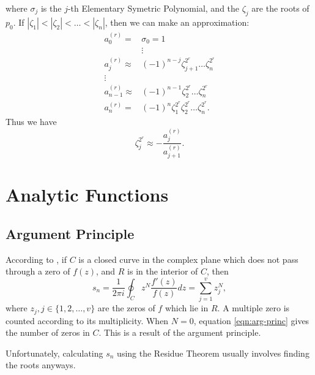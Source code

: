 \documentclass{article}
\begin{document}
where $\sigma_j$ is the $j$-th Elementary Symetric Polynomial\cite{wiki:symetric},
and the $\zeta_j$ are the roots of $p_0$.
If $|\zeta_1|<|\zeta_2|<\dots<|\zeta_n|$, then we can make an approximation:
\begin{equation}
	\begin{aligned}
		a_0^{(r)} =& \sigma_0 = 1 \\
		&\vdots \\
		a_j^{(r)} \approx& (-1)^{n-j}\zeta_{j+1}^{2^r}\dots\zeta_n^{2^r} \\
		\vdots \\
		a_{n-1}^{(r)} \approx& (-1)^{n-1}\zeta_2^{2^r}\dots\zeta_n^{2^r} \\
		a_n^{(r)} =& (-1)^n\zeta_1^{2^r}\zeta_2^{2^r}\dots\zeta_n^{2^r}.
	\end{aligned}
\end{equation}
Thus we have
\begin{equation}
	\zeta_j^{2^r}\approx-\frac{a_j^{(r)}}{a_{j+1}^{(r)}}.
\end{equation}




\section{Analytic Functions}

\subsection{Argument Principle}

According to \cite{delves1967numerical},
if $C$ is a closed curve in the complex plane which does not pass through a zero of $f(z)$, and $R$ is in the interior of $C$, 
then
\begin{equation}\label{eqn:arg-princ}
	s_n=\frac{1}{2\pi i}\oint_Cz^N\frac{f'(z)}{f(z)}dz=\sum_{j=1}^vz_j^N,
\end{equation}
where $z_j,j\in\{1,2,\dots,v\}$ are the zeros of $f$ which lie in $R$.
A multiple zero is counted according to its multiplicity.
When $N=0$, equation \ref{eqn:arg-princ} gives the number of zeros in $C$.
This is a result of the argument principle.\cite{wiki:argument-principle}

Unfortunately, calculating $s_n$ using the Residue Theorem usually involves finding the roots anyways.
\end{document}
